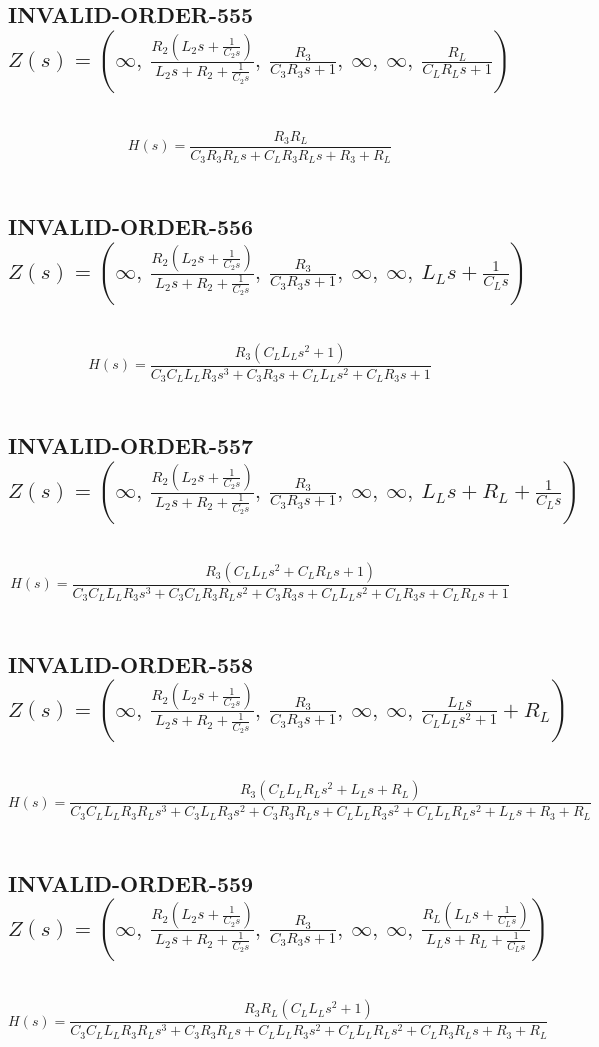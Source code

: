 \documentclass{article}
\begin{document}
\subsection{INVALID-ORDER-555 $Z(s) = \left( \infty, \  \frac{R_{2} \left(L_{2} s + \frac{1}{C_{2} s}\right)}{L_{2} s + R_{2} + \frac{1}{C_{2} s}}, \  \frac{R_{3}}{C_{3} R_{3} s + 1}, \  \infty, \  \infty, \  \frac{R_{L}}{C_{L} R_{L} s + 1}\right)$ } \ 
\textbf{\[H(s) = \frac{R_{3} R_{L}}{C_{3} R_{3} R_{L} s + C_{L} R_{3} R_{L} s + R_{3} + R_{L}}\] } \ 
\subsection{INVALID-ORDER-556 $Z(s) = \left( \infty, \  \frac{R_{2} \left(L_{2} s + \frac{1}{C_{2} s}\right)}{L_{2} s + R_{2} + \frac{1}{C_{2} s}}, \  \frac{R_{3}}{C_{3} R_{3} s + 1}, \  \infty, \  \infty, \  L_{L} s + \frac{1}{C_{L} s}\right)$ } \ 
\textbf{\[H(s) = \frac{R_{3} \left(C_{L} L_{L} s^{2} + 1\right)}{C_{3} C_{L} L_{L} R_{3} s^{3} + C_{3} R_{3} s + C_{L} L_{L} s^{2} + C_{L} R_{3} s + 1}\] } \ 
\subsection{INVALID-ORDER-557 $Z(s) = \left( \infty, \  \frac{R_{2} \left(L_{2} s + \frac{1}{C_{2} s}\right)}{L_{2} s + R_{2} + \frac{1}{C_{2} s}}, \  \frac{R_{3}}{C_{3} R_{3} s + 1}, \  \infty, \  \infty, \  L_{L} s + R_{L} + \frac{1}{C_{L} s}\right)$ } \ 
\textbf{\[H(s) = \frac{R_{3} \left(C_{L} L_{L} s^{2} + C_{L} R_{L} s + 1\right)}{C_{3} C_{L} L_{L} R_{3} s^{3} + C_{3} C_{L} R_{3} R_{L} s^{2} + C_{3} R_{3} s + C_{L} L_{L} s^{2} + C_{L} R_{3} s + C_{L} R_{L} s + 1}\] } \ 
\subsection{INVALID-ORDER-558 $Z(s) = \left( \infty, \  \frac{R_{2} \left(L_{2} s + \frac{1}{C_{2} s}\right)}{L_{2} s + R_{2} + \frac{1}{C_{2} s}}, \  \frac{R_{3}}{C_{3} R_{3} s + 1}, \  \infty, \  \infty, \  \frac{L_{L} s}{C_{L} L_{L} s^{2} + 1} + R_{L}\right)$ } \ 
\textbf{\[H(s) = \frac{R_{3} \left(C_{L} L_{L} R_{L} s^{2} + L_{L} s + R_{L}\right)}{C_{3} C_{L} L_{L} R_{3} R_{L} s^{3} + C_{3} L_{L} R_{3} s^{2} + C_{3} R_{3} R_{L} s + C_{L} L_{L} R_{3} s^{2} + C_{L} L_{L} R_{L} s^{2} + L_{L} s + R_{3} + R_{L}}\] } \ 
\subsection{INVALID-ORDER-559 $Z(s) = \left( \infty, \  \frac{R_{2} \left(L_{2} s + \frac{1}{C_{2} s}\right)}{L_{2} s + R_{2} + \frac{1}{C_{2} s}}, \  \frac{R_{3}}{C_{3} R_{3} s + 1}, \  \infty, \  \infty, \  \frac{R_{L} \left(L_{L} s + \frac{1}{C_{L} s}\right)}{L_{L} s + R_{L} + \frac{1}{C_{L} s}}\right)$ } \ 
\textbf{\[H(s) = \frac{R_{3} R_{L} \left(C_{L} L_{L} s^{2} + 1\right)}{C_{3} C_{L} L_{L} R_{3} R_{L} s^{3} + C_{3} R_{3} R_{L} s + C_{L} L_{L} R_{3} s^{2} + C_{L} L_{L} R_{L} s^{2} + C_{L} R_{3} R_{L} s + R_{3} + R_{L}}\] } \ 
\end{document}
